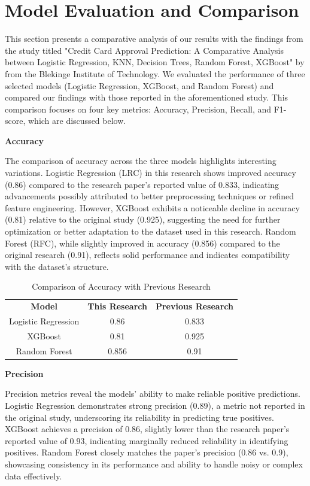 \documentclass[12pt]{report}
\begin{document}
    \chapter{Model Evaluation and Comparison}
    This section presents a comparative analysis of our results with the findings from the study titled "Credit Card Approval Prediction: A Comparative Analysis between Logistic Regression, KNN, Decision Trees, Random Forest, XGBoost" by \citeauthor{nandipati2024credit} from the Blekinge Institute of Technology. We evaluated the performance of three selected models (Logistic Regression, XGBoost, and Random Forest) and compared our findings with those reported in the aforementioned study. This comparison focuses on four key metrics: Accuracy, Precision, Recall, and F1-score, which are discussed below.

    {\bfseries Accuracy}

    The comparison of accuracy across the three models highlights interesting variations. Logistic Regression (LRC) in this research shows improved accuracy (0.86) compared to the research paper's reported value of 0.833, indicating advancements possibly attributed to better preprocessing techniques or refined feature engineering. However, XGBoost exhibits a noticeable decline in accuracy (0.81) relative to the original study (0.925), suggesting the need for further optimization or better adaptation to the dataset used in this research. Random Forest (RFC), while slightly improved in accuracy (0.856) compared to the original research (0.91), reflects solid performance and indicates compatibility with the dataset's structure.

    \begin{table}[h!]
        \centering
        \caption{Comparison of Accuracy with Previous Research}
        \begin{tabular}{|c|c|c|}
            \textbf{Model} & \textbf{This Research} & \textbf{Previous Research} \\
            Logistic Regression & 0.86 & 0.833 \\
            XGBoost & 0.81 & 0.925 \\
            Random Forest & 0.856 & 0.91 \\
        \end{tabular}
    \end{table}

    {\bfseries Precision}

    Precision metrics reveal the models' ability to make reliable positive predictions. Logistic Regression demonstrates strong precision (0.89), a metric not reported in the original study, underscoring its reliability in predicting true positives. XGBoost achieves a precision of 0.86, slightly lower than the research paper's reported value of 0.93, indicating marginally reduced reliability in identifying positives. Random Forest closely matches the paper's precision (0.86 vs. 0.9), showcasing consistency in its performance and ability to handle noisy or complex data effectively.
\end{document}
